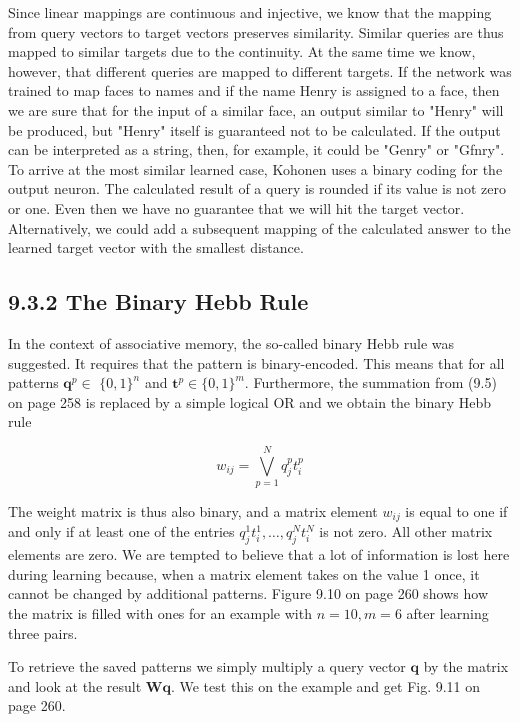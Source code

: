 \documentclass[10pt]{book}
\begin{document}
\begin{center}
\begin{enumerate}
\begin{center}
\begin{center}
\begin{center}
Since linear mappings are continuous and injective, we know that the mapping from query vectors to target vectors preserves similarity. Similar queries are thus mapped to similar targets due to the continuity. At the same time we know, however, that different queries are mapped to different targets. If the network was trained to map faces to names and if the name Henry is assigned to a face, then we are sure that for the input of a similar face, an output similar to "Henry" will be produced, but "Henry" itself is guaranteed not to be calculated. If the output can be interpreted as a string, then, for example, it could be "Genry" or "Gfnry". To arrive at the most similar learned case, Kohonen uses a binary coding for the output neuron. The calculated result of a query is rounded if its value is not zero or one. Even then we have no guarantee that we will hit the target vector. Alternatively, we could add a subsequent mapping of the calculated answer to the learned target vector with the smallest distance.

\subsection*{9.3.2 The Binary Hebb Rule}
In the context of associative memory, the so-called binary Hebb rule was suggested. It requires that the pattern is binary-encoded. This means that for all patterns $\boldsymbol{q}^{p} \in$ $\{0,1\}^{n}$ and $\boldsymbol{t}^{p} \in\{0,1\}^{m}$. Furthermore, the summation from (9.5) on page 258 is replaced by a simple logical OR and we obtain the binary Hebb rule


\begin{equation*}
w_{i j}=\bigvee_{p=1}^{N} q_{j}^{p} t_{i}^{p} \tag{9.10}
\end{equation*}


The weight matrix is thus also binary, and a matrix element $w_{i j}$ is equal to one if and only if at least one of the entries $q_{j}^{1} t_{i}^{1}, \ldots, q_{j}^{N} t_{i}^{N}$ is not zero. All other matrix elements are zero. We are tempted to believe that a lot of information is lost here during learning because, when a matrix element takes on the value 1 once, it cannot be changed by additional patterns. Figure 9.10 on page 260 shows how the matrix is filled with ones for an example with $n=10, m=6$ after learning three pairs.

To retrieve the saved patterns we simply multiply a query vector $\boldsymbol{q}$ by the matrix and look at the result $\boldsymbol{W} \boldsymbol{q}$. We test this on the example and get Fig. 9.11 on page 260.


\end{center}
\end{center}
\end{center}
\end{enumerate}
\end{center}
\end{document}
